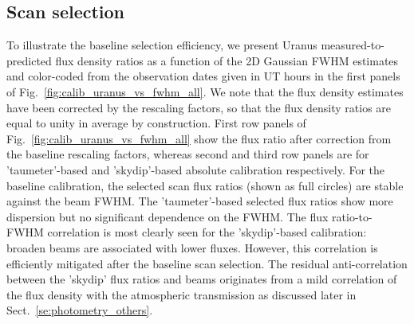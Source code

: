 
 
\subsection{Scan selection}
\label{se:baseline_calibration_scans}

To illustrate the baseline selection efficiency, we present Uranus
measured-to-predicted flux density ratios as a function of the 2D
Gaussian FWHM estimates and color-coded from the observation dates
given in UT hours in the first panels of
Fig.~\ref{fig:calib_uranus_vs_fwhm_all}.
We note that the flux density estimates have been corrected by the
rescaling factors, so that the flux density ratios are equal to unity
in average by construction. First row panels of
Fig.~\ref{fig:calib_uranus_vs_fwhm_all} show the flux ratio after
correction from the baseline rescaling factors, whereas second and
third row panels are for 'taumeter'-based and 'skydip'-based absolute
calibration respectively. For the baseline calibration, the selected
scan flux ratios (shown as full circles) are stable against the beam
FWHM. The 'taumeter'-based selected flux ratios show more dispersion
but no significant dependence on the FWHM. The flux ratio-to-FWHM
correlation is most clearly seen for the 'skydip'-based calibration:
broaden beams are associated with lower fluxes. However, this
correlation is efficiently mitigated after the baseline scan
selection. The residual anti-correlation between
the 'skydip' flux ratios and beams originates from a mild
correlation of the flux density with the atmospheric transmission as
discussed later in Sect.~\ref{se:photometry_others}. 

